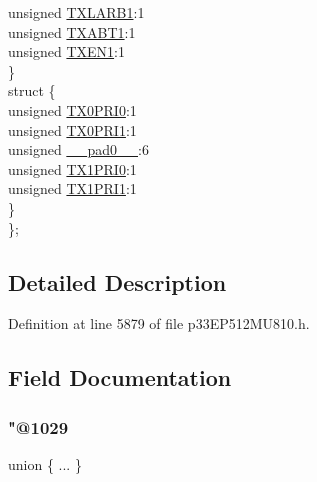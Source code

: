 \begin{DoxyCompactItemize}
\begin{tabbing}
\>\>unsigned \hyperlink{structtag_c2_t_r01_c_o_n_b_i_t_s_a468bd2237b3f0a8869bbd5cef0b996c9}{TXLARB1}:1\\
\>\>unsigned \hyperlink{structtag_c2_t_r01_c_o_n_b_i_t_s_a8ff9c4b1b81fd7ec4172261ab6fa1741}{TXABT1}:1\\
\>\>unsigned \hyperlink{structtag_c2_t_r01_c_o_n_b_i_t_s_ab8e4fce373a420fc90c53175f76e693e}{TXEN1}:1\\
\>\} \\
\>struct \{\\
\>\>unsigned \hyperlink{structtag_c2_t_r01_c_o_n_b_i_t_s_a89d7855315c29b4f35c810f3d352ba88}{TX0PRI0}:1\\
\>\>unsigned \hyperlink{structtag_c2_t_r01_c_o_n_b_i_t_s_a6c10142f674b5a8e8b8028e92876c78c}{TX0PRI1}:1\\
\>\>unsigned \hyperlink{structtag_c2_t_r01_c_o_n_b_i_t_s_adf71f3d8410c1f1dbbc96680a92c49af}{\_\_pad0\_\_}:6\\
\>\>unsigned \hyperlink{structtag_c2_t_r01_c_o_n_b_i_t_s_ac484a0ec095bc41f61eecdbb771dc490}{TX1PRI0}:1\\
\>\>unsigned \hyperlink{structtag_c2_t_r01_c_o_n_b_i_t_s_a81407c826a28b04b9810f5b2757f6c98}{TX1PRI1}:1\\
\>\} \\
\}; \\

\end{tabbing}\end{DoxyCompactItemize}


\subsection{Detailed Description}


Definition at line 5879 of file p33\+E\+P512\+M\+U810.\+h.



\subsection{Field Documentation}
\mbox{\label{structtag_c2_t_r01_c_o_n_b_i_t_s_a7a1467cfca5a1817d5706afedea6d4ce}} 
\subsubsection{\texorpdfstring{"@1029}{@1029}}
{\footnotesize\ttfamily union \{ ... \} }

\mbox{\label{structtag_c2_t_r01_c_o_n_b_i_t_s_adf71f3d8410c1f1dbbc96680a92c49af}} 
